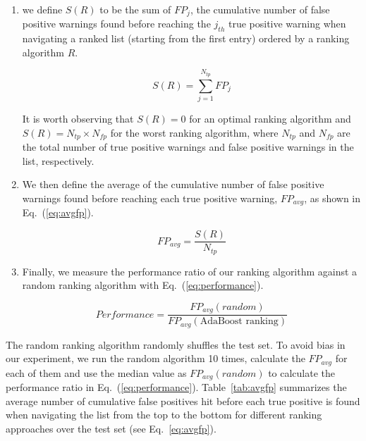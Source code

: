 \begin{enumerate}

\item we define $S(R)$ to be the
sum of $FP_j$, the cumulative number of false positive warnings found before
reaching the $j_{th}$ true positive warning when navigating a ranked list
(starting from the first entry) ordered by a ranking algorithm $R$.

\begin{equation}\label{eq:sr}
  S\left(R\right) = \sum\limits_{j=1}^{N_{tp}} \mathit{FP}_j
\end{equation}

It is worth observing that $S\left(R\right) = 0$ for an optimal ranking algorithm and
$S\left(R\right) = N_{tp} \times N_{fp}$ for the worst ranking algorithm, where $N_{tp}$
and $N_{fp}$ are the total number of true positive warnings and false positive
warnings in the list, respectively.

\item We then define the average of the cumulative number of false positive
warnings found before reaching each true positive warning, $\mathit{FP}_{avg}$, as shown
in Eq.~(\ref{eq:avgfp}).

\begin{equation}\label{eq:avgfp}
  \mathit{FP}_{avg} = \frac{S\left(R\right)}{N_{tp}}
\end{equation}

\item Finally, we measure the performance ratio of our ranking algorithm against a random
ranking algorithm with Eq.~(\ref{eq:performance}).

\begin{equation}\label{eq:performance}
  \mathit{Performance} = \frac{\mathit{FP}_{avg}(\mathit{random})}{\mathit{FP}_{avg}(\text{AdaBoost ranking})}
\end{equation}

\end{enumerate}

The random ranking algorithm randomly shuffles the test set. To avoid bias in
our experiment, we run the random algorithm 10 times, calculate the
$\mathit{FP}_{avg}$ for each of them and use the median value as
$\mathit{FP}_{avg}(\mathit{random})$ to calculate the performance ratio in
Eq.~(\ref{eq:performance}). Table~\ref{tab:avgfp} summarizes the average number
of cumulative false positives hit before each true positive is found when
navigating the list from the top to the bottom for different ranking approaches
over the test set (see Eq.~\ref{eq:avgfp}).


